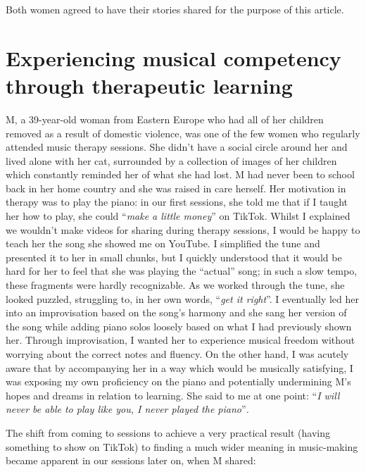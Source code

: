 \documentclass[authordate, empirical]{jote-new-article}
\begin{document}
Both women agreed to have their stories shared for the purpose of this article.







\section{Experiencing musical competency through therapeutic learning}







M, a 39-year-old woman from Eastern Europe who had all of her children removed as a result of domestic violence, was one of the few women who regularly attended music therapy sessions. She didn't have a social circle around her and lived alone with her cat, surrounded by a collection of images of her children which constantly reminded her of what she had lost. M had never been to school back in her home country and she was raised in care herself. Her motivation in therapy was to play the piano: in our first sessions, she told me that if I taught her how to play, she could “\emph{make a little money}” on TikTok. Whilst I explained we wouldn't make videos for sharing during therapy sessions, I would be happy to teach her the song she showed me on YouTube. I simplified the tune and presented it to her in small chunks, but I quickly understood that it would be hard for her to feel that she was playing the “actual” song; in such a slow tempo, these fragments were hardly recognizable. As we worked through the tune, she looked puzzled, struggling to, in her own words, “\emph{get it right}”. I eventually led her into an improvisation based on the song's harmony and she sang her version of the song while adding piano solos loosely based on what I had previously shown her. Through improvisation, I wanted her to experience musical freedom without worrying about the correct notes and fluency. On the other hand, I was acutely aware that by accompanying her in a way which would be musically satisfying, I was exposing my own proficiency on the piano and potentially undermining M's hopes and dreams in relation to learning. She said to me at one point: “\emph{I will never be able to play like you, I never played the piano}”\emph{.}







The shift from coming to sessions to achieve a very practical result (having something to show on TikTok) to finding a much wider meaning in music-making became apparent in our sessions later on, when M shared:
\end{document}
